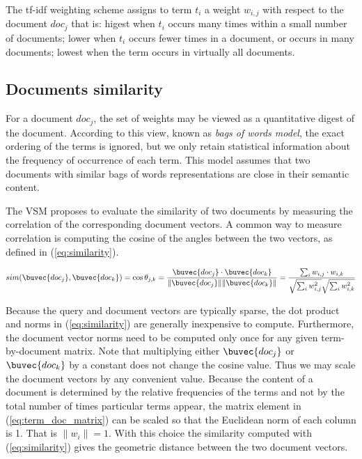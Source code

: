 The tf-idf weighting scheme assigns to term $t_i$ a weight $w_{i,j}$ with respect to the document $doc_j$ that is: higest when $t_i$ occurs many times within a small number of documents; lower when $t_i$ occurs fewer times in a document, or occurs in many documents; lowest when the term occurs in virtually all documents.

\subsection{Documents similarity}
For a document $doc_j$, the set of weights may be viewed as a quantitative digest of the document. According to this view, known as \emph{bags of words model}, the exact ordering of the terms is ignored, but we only retain statistical information about the frequency of occurrence of each term. This model assumes that two documents with similar bags of words representations are close in their semantic content.

The VSM proposes to evaluate the similarity of two documents by measuring the correlation of the corresponding document vectors. A common way to measure correlation is computing the cosine of the angles between the two vectors, as defined in (\ref{eq:similarity}).

\begin{equation}\label{eq:similarity}
 sim(\buvec{doc_j},\buvec{doc_k}) = \cos \theta_{j,k} = \frac{\buvec{doc_j} \cdot \buvec{doc_k}}{\|\buvec{doc_j}\| \|\buvec{doc_k}\|} = \frac{\sum_i w_{i,j} \cdot w_{i,k}}{\sqrt{\sum_i w_{i,j}^2 } \sqrt{\sum_i w_{i,k}^2 }  }
\end{equation}

Because the query and document vectors are typically sparse, the dot product and norms in (\ref{eq:similarity}) are generally inexpensive to compute. Furthermore, the document vector norms need to be computed only once for any given term-by-document matrix. Note that multiplying either $\buvec{doc_j}$ or $\buvec{doc_k}$ by a constant does not change the cosine value. Thus we may scale the document vectors by any convenient value. Because the content of a document is determined by the relative frequencies of the terms and not by the total number of times particular terms appear, the matrix element in (\ref{eq:term_doc_matrix}) can be scaled so that the Euclidean norm of each column is 1. That is $\|w_{i}\| = 1$. With this choice the similarity computed with (\ref{eq:similarity}) gives the geometric distance between the two document vectors.

